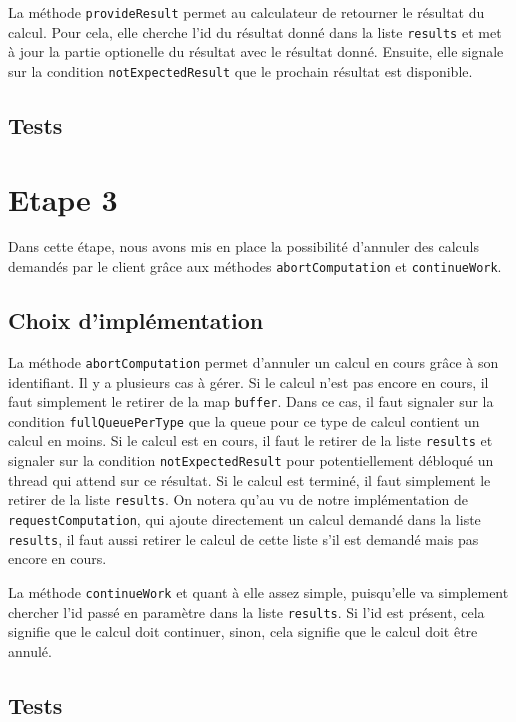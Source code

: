 \documentclass{article}
\begin{document}
La méthode \texttt{provideResult} permet au calculateur de retourner le résultat du calcul. Pour cela, elle cherche
l'id du résultat donné dans la liste \texttt{results} et met à jour la partie optionelle du résultat avec le résultat
donné. Ensuite, elle signale sur la condition \texttt{notExpectedResult} que le prochain résultat est disponible.


\subsection{Tests}

\section{Etape 3}
Dans cette étape, nous avons mis en place la possibilité d’annuler des calculs demandés par le client grâce aux méthodes
\texttt{abortComputation} et \texttt{continueWork}.

\subsection{Choix d'implémentation}
La méthode \texttt{abortComputation} permet d’annuler un calcul en cours grâce à son identifiant. Il y a plusieurs
cas à gérer. Si le calcul n’est pas encore en cours, il faut simplement le retirer de la map \texttt{buffer}. Dans
ce cas, il faut signaler sur la condition \texttt{fullQueuePerType} que la queue pour ce type de calcul contient un
calcul en moins. Si le calcul est en cours, il faut le retirer de la liste \texttt{results} et signaler sur
la condition \texttt{notExpectedResult} pour potentiellement débloqué un thread qui attend sur ce résultat.
Si le calcul est terminé, il faut simplement le retirer de la liste \texttt{results}.
On notera qu'au vu de notre implémentation de \texttt{requestComputation}, qui ajoute directement un calcul demandé
dans la liste \texttt{results}, il faut aussi retirer le calcul de cette liste s'il est demandé mais pas encore en
cours.

La méthode \texttt{continueWork} et quant à elle assez simple, puisqu'elle va simplement chercher l'id passé en
paramètre dans la liste \texttt{results}. Si l'id est présent, cela signifie que le calcul doit continuer, sinon, cela
signifie que le calcul doit être annulé.

\subsection{Tests}
\end{document}
